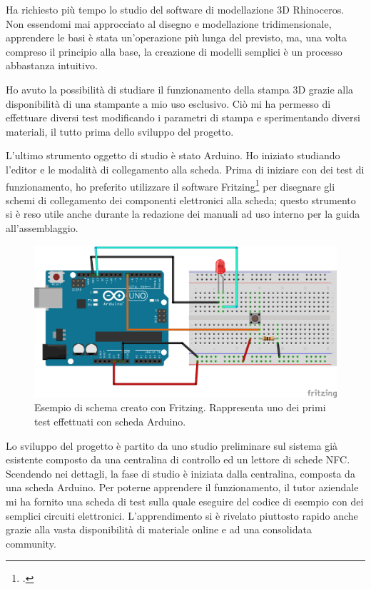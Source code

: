 \medskip

Ha richiesto più tempo lo studio del software di modellazione 3D Rhinoceros. Non essendomi mai approcciato al disegno e modellazione tridimensionale, apprendere le basi è stata un'operazione più lunga del previsto, ma, una volta compreso il principio alla base, la creazione di modelli semplici è un processo abbastanza intuitivo.

Ho avuto la possibilità di studiare il funzionamento della stampa 3D grazie alla disponibilità di una stampante a mio uso esclusivo. Ciò mi ha permesso di effettuare diversi test modificando i parametri di stampa e sperimentando diversi materiali, il tutto prima dello sviluppo del progetto.

\medskip

L'ultimo strumento oggetto di studio è stato Arduino. Ho iniziato studiando l'editor e le modalità di collegamento alla scheda. Prima di iniziare con dei test di funzionamento, ho preferito utilizzare il software Fritzing\footcite{http://fritzing.org/} per disegnare gli schemi di collegamento dei componenti elettronici alla scheda; questo strumento si è reso utile anche durante la redazione dei manuali ad uso interno per la guida all'assemblaggio.

\begin{figure}[H]
	\begin{center}
	\includegraphics[scale=0.62]{immagini/schema_arduino.png}
	\caption{Esempio di schema creato con Fritzing. Rappresenta uno dei primi test effettuati con scheda Arduino.}
	\end{center}
\end{figure}

Lo sviluppo del progetto è partito da uno studio preliminare sul sistema già esistente composto da una centralina di controllo ed un lettore di schede NFC.
Scendendo nei dettagli, la fase di studio è iniziata dalla centralina, composta da una scheda Arduino. Per poterne apprendere il funzionamento, il tutor aziendale mi ha fornito una scheda di test sulla quale eseguire del codice di esempio con dei semplici circuiti elettronici. L'apprendimento si è rivelato piuttosto rapido anche grazie alla vasta disponibilità di materiale online e ad una consolidata community.

